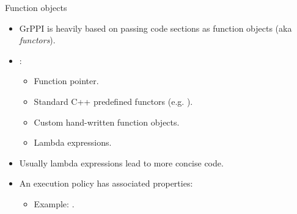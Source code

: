 \begin{frame}[t]{Function objects}
\begin{itemize}
  \item GrPPI is heavily based on passing code sections as function objects
        (aka \emph{functors}).
  \vfill
  \item {}:
    \begin{itemize}
      \item Function pointer.
      \item Standard C++ predefined functors (e.g. ).
      \item Custom hand-written function objects.
      \item Lambda expressions.
    \end{itemize}
  \vfill
  \item Usually lambda expressions lead to more concise code.
  \vfill
  \item An execution policy has associated properties:
    \begin{itemize}
      \item Example: .
    \end{itemize}
\end{itemize}
\end{frame}

